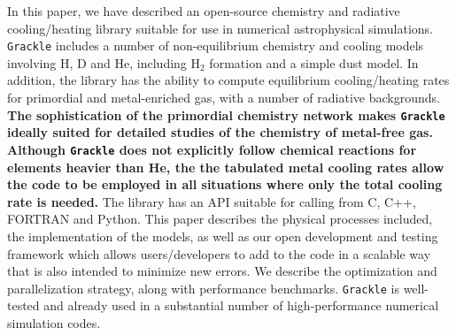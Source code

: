 In this paper, we have described an open-source chemistry and
radiative cooling/heating library suitable for use in numerical
astrophysical simulations.  \texttt{Grackle} includes a number of
non-equilibrium chemistry and cooling models involving H, D and He,
including H$_2$ formation and a simple dust model.  In addition, the
library has the ability to compute equilibrium cooling/heating rates
for primordial and metal-enriched gas, with a number of radiative
backgrounds.  {\bf The sophistication of the primordial chemistry network
makes \texttt{Grackle} ideally suited for detailed studies of the
chemistry of metal-free gas.  Although \texttt{Grackle} does not
explicitly follow chemical reactions for elements heavier than He, the
the tabulated metal cooling rates allow the code to be employed in all
situations where only the total cooling rate is needed.}
The library has an API suitable for calling from C, C++,
FORTRAN and Python.  This paper describes the physical processes
included, the implementation of the models, as well as our open
development and testing framework which allows users/developers to add
to the code in a scalable way that is also intended to minimize new
errors.  We describe the optimization and parallelization strategy,
along with performance benchmarks.  \texttt{Grackle} is well-tested and already
used in a substantial number of high-performance numerical simulation
codes.



